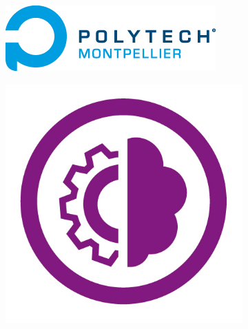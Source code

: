 \documentclass[12pt,x11names]{article}
\title{\doctitle}
\date{\docdate}
\begin{document}
\author[1]{Thomas MAURAN}
\author[1]{Alexandre SOLLIER}


\begin{titlepage}
\begin{figure}[t]
    \centering
    \begin{subfigure}[t]{0.4\textwidth}
        \centering
        \includegraphics[width=\textwidth]{imgs/um_logo.png}
    \end{subfigure}
    \hskip 2cm
    \begin{subfigure}[t]{0.13\textwidth}
        \centering
        \includegraphics[width=\textwidth]{imgs/do_logo.jpg}
    \end{subfigure}
\end{figure}

\setcounter{figure}{0}

\maketitle
\thispagestyle{empty}
\end{titlepage}
\end{document}
